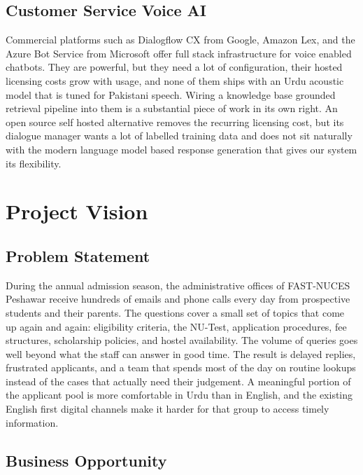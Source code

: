 \documentclass[12pt,a4paper]{report}
\begin{document}
\subsection{Customer Service Voice AI}

Commercial platforms such as Dialogflow CX from Google, Amazon Lex, and
the Azure Bot Service from Microsoft offer full stack infrastructure for
voice enabled chatbots. They are powerful, but they need a lot of
configuration, their hosted licensing costs grow with usage, and none of
them ships with an Urdu acoustic model that is tuned for Pakistani speech.
Wiring a knowledge base grounded retrieval pipeline into them is a
substantial piece of work in its own right. An open source self hosted
alternative removes the recurring licensing cost, but its dialogue
manager wants a lot of labelled training data and does not sit naturally
with the modern language model based response generation that gives our
system its flexibility.

\newpage
\section{Project Vision}

\subsection{Problem Statement}

During the annual admission season, the administrative offices of
FAST-NUCES Peshawar receive hundreds of emails and phone calls every day
from prospective students and their parents. The questions cover a small
set of topics that come up again and again: eligibility criteria, the
NU-Test, application procedures, fee structures, scholarship policies, and
hostel availability. The volume of queries goes well beyond what the staff
can answer in good time. The result is delayed replies, frustrated
applicants, and a team that spends most of the day on routine lookups
instead of the cases that actually need their judgement. A meaningful
portion of the applicant pool is more comfortable in Urdu than in English,
and the existing English first digital channels make it harder for that
group to access timely information.

\subsection{Business Opportunity}
\end{document}
